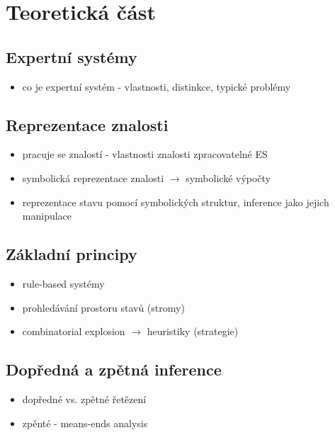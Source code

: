 \section{Teoretická část}

\subsection{Expertní systémy}
\begin{framed}
  \begin{itemize}
    \item co je expertní systém - vlastnosti, distinkce, typické problémy
  \end{itemize}
\end{framed}

\subsection{Reprezentace znalosti}
\begin{framed}
  \begin{itemize}
    \item pracuje se znalostí - vlastnosti znalosti zpracovatelné ES
    \item symbolická reprezentace znalosti $\rightarrow$ symbolické výpočty
      \item reprezentace stavu pomocí symbolických struktur, inference jako jejich manipulace
  \end{itemize}
\end{framed}

\subsection{Základní principy}
\begin{framed}
  \begin{itemize}
    \item rule-based systémy
    \item prohledávání prostoru stavů (stromy)
    \item combinatorial explosion $\rightarrow$ heuristiky (strategie)
  \end{itemize}
\end{framed}

\subsection{Dopředná a zpětná inference}
\begin{framed}
  \begin{itemize}
    \item dopředné vs. zpětné řetězení
    \item zpěnté - means-ends analysis
  \end{itemize}
\end{framed}


